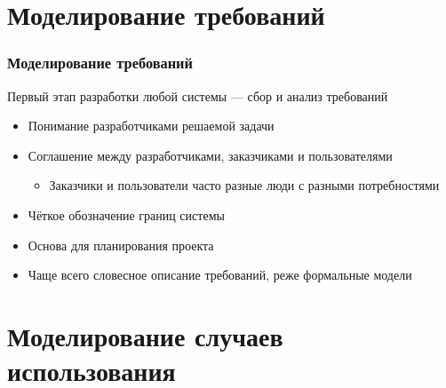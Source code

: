 \documentclass{../../slides-style}
\begin{document}
    \begin{frame}[plain]
        \titlepage
    \end{frame}

    \section{Моделирование требований}

    \begin{frame}
        \frametitle{Моделирование требований}
        Первый этап разработки любой системы --- сбор и анализ требований
        \begin{itemize}
            \item Понимание разработчиками решаемой задачи
            \item Соглашение между разработчиками, заказчиками и пользователями
            \begin{itemize}
                \item Заказчики и пользователи часто разные люди с разными потребностями
            \end{itemize}
            \item Чёткое обозначение границ системы
            \item Основа для планирования проекта
            \item Чаще всего словесное описание требований, реже формальные модели
        \end{itemize}
    \end{frame}

    \section{Моделирование случаев использования}
    
\end{document}
